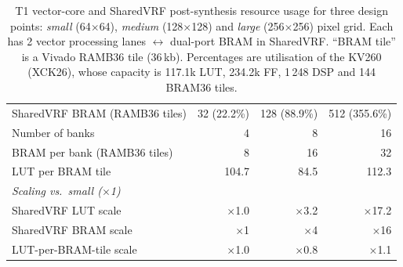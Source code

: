 \documentclass[11pt]{article}
\begin{document}
\begin{table}[t]
\begin{tabular}{l rrr}
    SharedVRF BRAM (RAMB36 tiles)         & 32 (22.2\%)     & 128 (88.9\%)    & 512 (355.6\%)    \\
    Number of banks                       & 4               & 8               & 16               \\
    BRAM per bank (RAMB36 tiles)          & 8               & 16              & 32               \\
    LUT per BRAM tile                     & 104.7           & 84.5            & 112.3            \\
    \midrule
    \multicolumn{4}{l}{\textit{Scaling vs.\ small ($\times$1)}}\\
    SharedVRF LUT scale                   & $\times$1.0     & $\times$3.2     & $\times$17.2     \\
    SharedVRF BRAM scale                  & $\times$1       & $\times$4       & $\times$16       \\
    LUT-per-BRAM-tile scale               & $\times$1.0     & $\times$0.8     & $\times$1.1      \\
    \bottomrule
  \end{tabular}
  \caption{T1 vector-core and SharedVRF post-synthesis resource usage for three
    design points: \emph{small} (64$\times$64), \emph{medium} (128$\times$128)
    and \emph{large} (256$\times$256) pixel grid. Each has 2 vector processing
    lanes $\leftrightarrow$ dual-port BRAM in SharedVRF. ``BRAM tile'' is a
    Vivado RAMB36 tile (36\,kb). Percentages are utilisation of the KV260
    (XCK26), whose capacity is 117.1k LUT, 234.2k FF, 1\,248 DSP and 144
    BRAM36 tiles.}
  \label{tab:dlen-sweep}
\end{table}
\end{document}
